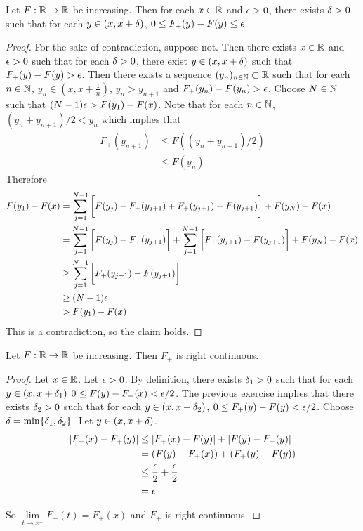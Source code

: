 \documentclass{book}
\begin{document}
	\begin{ex}  
		Let $F:\mathbb{R} \rightarrow \mathbb{R}$ be increasing. Then for each $x \in \mathbb{R}$ and $ \epsilon>0$, there exists $\delta >0$ such that for each $y \in (x,x+\delta)$, $0 \leq F_+(y) - F(y) \leq \epsilon$.
	\end{ex}
	
	\begin{proof}
		For the sake of contradiction, suppose not. Then there exists $x \in \mathbb{R}$ and $\epsilon >0$ such that for each $\delta >0$, there exist $y \in (x,x+\delta)$ such that $F_+(y) - F(y) > \epsilon$. Then there exists a sequence $(y_n)_{n \in \mathbb{N}} \subset \mathbb{R}$ such that for each $n \in \mathbb{N}$, $y_n \in (x, x+\frac{1}{n})$, $y_n > y_{n+1}$ and $F_+(y_n) - F(y_n) > \epsilon$. Choose $N \in \mathbb{N}$ such that $(N-1)\epsilon > F(y_1) - F(x)$. Note that for each $n \in \mathbb{N}$, $(y_n + y_{n+1})/ 2 < y_n$ which implies that
		\begin{align*}
			F_+(y_{n+1})
			& \leq F((y_n + y_{n+1})/ 2) \\
			& \leq F(y_n)
		\end{align*}
		Therefore
		\begin{align*}
			F(y_1) - F(x) 
			&= \sum_{j=1}^{N-1} \bigg[F(y_j)-F_+(y_{j+1}) + F_+(y_{j+1}) - F(y_{j+1}) \bigg] + F(y_N)- F(x)\\
			& = \sum_{j=1}^{N-1} \bigg[F(y_j)-F_+(y_{j+1}) \bigg] + \sum_{j=1}^{N-1} \bigg[ F_+(y_{j+1}) - F(y_{j+1}) \bigg] + F(y_N)- F(x) \\
			& \geq \sum_{j=1}^{N-1} \bigg[ F_+(y_{j+1}) - F(y_{j+1}) \bigg]  \\
			& \geq (N-1)\epsilon \\
			& > F(y_1) - F(x)
		\end{align*}
		This is a contradiction, so the claim holds.
	\end{proof}
	
	\begin{ex}  
		Let $F:\mathbb{R} \rightarrow \mathbb{R}$ be increasing. Then $F_+$ is right continuous. 
	\end{ex}
	
	\begin{proof}
		Let $x \in \mathbb{R}$. Let $\epsilon >0$. By definition, there exists $\delta_1>0$ such that for each $y \in (x,x+\delta_1)$ $0 \leq F(y)-F_+(x) < \epsilon/2$. The previous exercise implies that there exists $\delta_2 >0$ such that for each $y \in (x,x+\delta_2)$, $0 \leq F_+(y)-F(y) < \epsilon/2$. Choose $\delta = \min\{\delta_1, \delta_2\}$. Let $y \in (x, x+\delta)$.
		\begin{align*}
			|F_+(x) - F_+(y)|
			& \leq |F_+(x) - F(y)| + |F(y)- F_+(y)| \\
			& = (F(y) - F_+(x)) + (F_+(y) - F(y)) \\
			& \leq \frac{\epsilon}{2} + \frac{\epsilon}{2}\\
			& = \epsilon
		\end{align*}
		
		So $\lim\limits_{t \rightarrow x^+} F_+(t) = F_+(x)$ and $F_+$ is right continuous.
	\end{proof}
	
\end{document}
